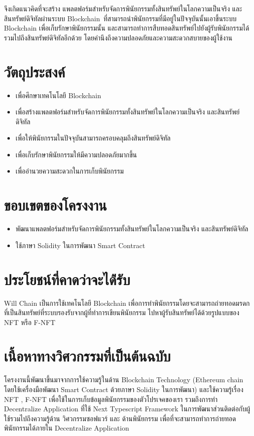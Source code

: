 \documentclass[12pt,oneside,openright,a4paper]{cpe-thai-project}
\begin{document}
\tab จึงเกิดแนวคิดที่จะสร้าง แพลตฟอร์มสำหรับจัดการพินัยกรรมทั้งสินทรัพย์ในโลกความเป็นจริง และสินทรัพย์ดิจิทัลผ่านระบบ Blockchain\ ที่สามารถนำพินัยกรรมที่มีอยู่ในปัจจุบันนั้นเอาขึ้นระบบ Blockchain เพื่อเก็บรักษาพินัยกรรมนั้น และสามารถทำการสืบทอดสินทรัพย์ไปยังผู้รับพินัยกรรมได้ รวมไปถึงสินทรัพย์ดิจิทัลอีกด้วย โดยคำนึงถึงความปลอดภัยและความสะดวกสบายของผู้ใช้งาน


\section{วัตถุประสงค์}

\begin{itemize}
\item เพื่อศึกษาเทคโนโลยี Blockchain
\item เพื่อสร้างแพลตฟอร์มสำหรับจัดการพินัยกรรมทั้งสินทรัพย์ในโลกความเป็นจริง และสินทรัพย์ดิจิทัล
\item เพื่อให้พินัยกรรมในปัจจุบันสามารถครอบคลุมถึงสินทรัพย์ดิจิทัล
\item เพื่อเก็บรักษาพินัยกรรมให้มีความปลอดภัยมากขึ้น
\item เพื่ออำนวยความสะดวกในการเก็บพินัยกรรม
\end{itemize}

\section{ขอบเขตของโครงงาน}

\begin{itemize}
\item พัฒนาแพลตฟอร์มสำหรับจัดการพินัยกรรมทั้งสินทรัพย์ในโลกความเป็นจริง และสินทรัพย์ดิจิทัล
\item ใช้ภาษา Solidity ในการพัฒนา Smart Contract
\end{itemize}

\section{ประโยชน์ที่คาดว่าจะได้่รับ}
\tab Will Chain เป็นการใช้เทคโนโลยี Blockchain เพื่อการทำพินัยกรรมโดยจะสามารถถ่ายทอดมรดกที่เป็นสินทรัพย์ที่ระบบรองรับจากผู้ที่ทำการเขียนพินัยกรรม ไปหาผู้รับสินทรัพย์ได้ด้วยรูปแบบของ NFT หรือ F-NFT
\section{เนื้อหาทางวิศวกรรมที่เป็นต้นฉบับ}
\tab โครงงานนี้พัฒนาขึ้นมาจากการใช้ความรู้ในด้าน Blockchain Technology (Ethereum chain โดยใช้เครื่องมือพัฒนา Smart Contract ด้วยภาษา Solidity ในการพัฒนา)  และใช้ความรู้เรื่อง NFT , F-NFT เพื่อใช้ในการเก็บข้อมูลพินัยกรรมของตัวโปรเจคของเรา รวมถึงการทำ Decentralize  Application ที่ใช้ Next Typescript Framework ในการพัฒนาส่วนติดต่อกับผู้ใช้รวมไปถึงความรู้ด้าน วิศวกรรมซอฟแวร์ และ ด้านพินัยกรรม เพื่อที่จะสามารถทำการถ่ายทอดพินัยกรรมได้ภายใน Decentralize  Application
\clearpage
\end{document}

